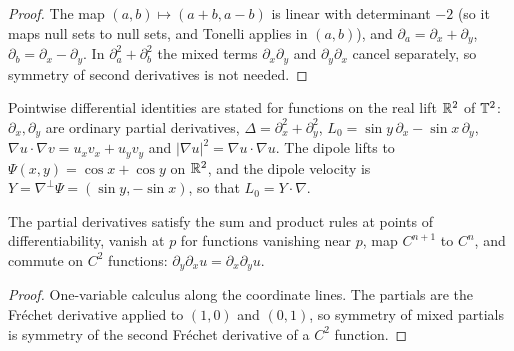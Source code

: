 \begin{proof}
\leanok
The map $(a,b)\mapsto(a+b,a-b)$ is linear with determinant $-2$ (so it maps null sets to
null sets, and Tonelli applies in $(a,b)$), and
$\partial_a=\partial_x+\partial_y$, $\partial_b=\partial_x-\partial_y$. In
$\partial_a^2+\partial_b^2$ the mixed terms $\partial_x\partial_y$ and
$\partial_y\partial_x$ cancel separately, so symmetry of second derivatives is not
needed.
\end{proof}

\begin{definition}
\label{def:lift-operators}
\leanok
Pointwise differential identities are stated for functions on the real lift
$\mathbb{R}^2$ of $\mathbb{T}^2$: $\partial_x,\partial_y$ are ordinary partial derivatives,
$\Delta=\partial_x^2+\partial_y^2$, $L_0=\sin y\,\partial_x-\sin x\,\partial_y$,
$\nabla u\cdot\nabla v=u_xv_x+u_yv_y$ and $|\nabla u|^2=\nabla u\cdot\nabla u$.
The dipole lifts to $\Psi(x,y)=\cos x+\cos y$ on $\mathbb{R}^2$, and the dipole velocity
is $Y=\nabla^\perp\Psi=(\sin y,-\sin x)$, so that $L_0=Y\cdot\nabla$.
\end{definition}

\begin{lemma}
\label{lem:lift-calculus}
\leanok
The partial derivatives satisfy the sum and product rules at points of
differentiability, vanish at $p$ for functions vanishing near $p$, map $C^{n+1}$
to $C^n$, and commute on $C^2$ functions: $\partial_y\partial_xu=\partial_x\partial_yu$.
\end{lemma}

\begin{proof}
\leanok
One-variable calculus along the coordinate lines. The partials are the
Fréchet derivative applied to $(1,0)$ and $(0,1)$, so symmetry of mixed
partials is symmetry of the second Fréchet derivative of a $C^2$ function.
\end{proof}

